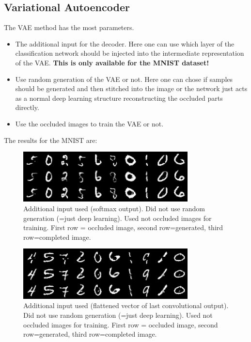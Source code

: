 \documentclass[
     11pt,         %
     a4paper,      %
     oneside,
     ]{article}
\begin{document}
\subsection{Variational Autoencoder}
The VAE method has the most parameters.
\begin{itemize}
  \item The additional input for the decoder. Here one can use which layer of the classification network should be injected into the intermediate representation of the VAE. \textbf{This is only available for the MNIST dataset!}
  \item Use random generation of the VAE or not. Here one can chose if samples should be generated and then stitched into the image or the network just acts as a normal deep learning structure reconstructing the occluded parts directly.
  \item Use the occluded images to train the VAE or not.
\end{itemize}
The results for the MNIST are:
\begin{figure}[H]
  \begin{center}
    \includegraphics[width=0.8\textwidth]{presentation_results/VAE/MNIST-VAE-useRandom_false-useMNIST_true-VAERepresentation_3-useOccludedForTrain_false.png}
    \caption{Additional input used (softmax output). Did not use random generation (=just deep learning). Used not occluded images for training. First row = occluded image, second row=generated, third row=completed image.}
  \end{center}
\end{figure}
\begin{figure}[H]
  \begin{center}
    \includegraphics[width=0.8\textwidth]{presentation_results/VAE/MNIST-VAE-useRandom_true-useMNIST_true-VAERepresentation_1-useOccludedForTrain_false.png}
    \caption{Additional input used (flattened vector of last convolutional output). Did not use random generation (=just deep learning). Used not occluded images for training. First row = occluded image, second row=generated, third row=completed image.}
  \end{center}
\end{figure}
\end{document}
